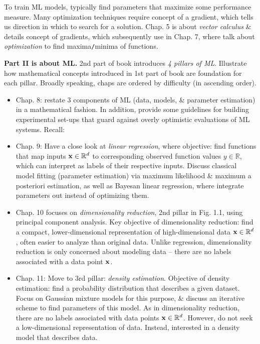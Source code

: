 \documentclass{article}
\begin{document}
\begin{enumerate}
\begin{itemize}
\begin{itemize}
\begin{itemize}
				To train ML models, typically find parameters that maximize some performance measure. Many optimization techniques require concept of a gradient, which tells us direction in which to search for a solution. Chap. 5 is about {\it vector calculus} \& details concept of gradients, which subsequently use in Chap. 7, where talk about {\it optimization} to find maxima{\tt/}minima of functions.
			\end{itemize}
			{\bf Part II is about ML.} 2nd part of book introduces {\it4 pillars of ML}. Illustrate how mathematical concepts introduced in 1st part of book are foundation for each pillar. Broadly speaking, chaps are ordered by difficulty (in ascending order).
			\begin{itemize}
				\item Chap. 8: restate 3 components of ML (data, models, \& parameter estimation) in a mathematical fashion. In addition, provide some guidelines for building experimental set-ups that guard against overly optimistic evaluations of ML systems. Recall: 
				\item Chap. 9: Have a close look at {\it linear regression}, where objective: find functions that map inputs ${\bf x}\in\mathbb{R}^d$ to corresponding observed function values $y\in\mathbb{R}$, which can interpret as labels of their respective inputs. Discuss classical model fitting (parameter estimation) via maximum likelihood \& maximum a posteriori estimation, as well as Bayesan linear regression, where integrate parameters out instead of optimizing them.
				\item Chap. 10 focuses on {\it dimensionality reduction}, 2nd pillar in Fig. 1.1, using principal component analysis. Key objective of dimensionality reduction: find a compact, lower-dimensional representation of high-dimensional data ${\bf x}\in\mathbb{R}^d$, often easier to analyze than original data. Unlike regression, dimensionality reduction is only concerned about modeling data -- there are no labels associated with a data point ${\bf x}$.
				\item Chap. 11: Move to 3rd pillar: {\it density estimation}. Objective of density estimation: find a probability distribution that describes a given dataset. Focus on Gaussian mixture models for this purpose, \& discuss an iterative scheme to find parameters of this model. As in dimensionality reduction, there are no labels associated with data points ${\bf x}\in\mathbb{R}^d$. However, do not seek a low-dimensional representation of data. Instead, interested in a density model that describes data.

\end{itemize}
\end{itemize}
\end{itemize}
\end{enumerate}
\end{document}
